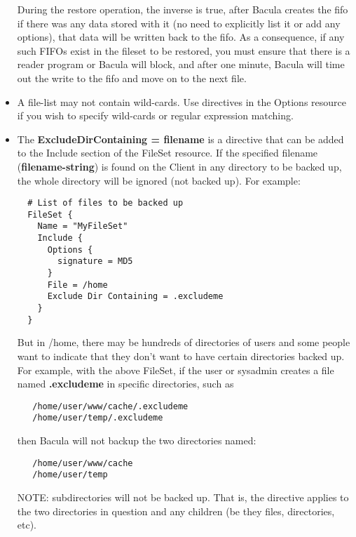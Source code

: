 \begin{itemize}
   During the restore operation, the inverse is true, after Bacula creates
   the fifo if there was any data stored with it (no need to explicitly
   list it or add any options), that data will be written back to the fifo.
   As a consequence, if any such FIFOs exist in the fileset to be restored,
   you must ensure that there is a reader program or Bacula will block, and
   after one minute, Bacula will time out the write to the fifo and move on
   to the next file.

\item A file-list may not contain wild-cards. Use directives in the
   Options resource if you wish to specify wild-cards or regular expression
   matching.

\item
{}
The {\bf ExcludeDirContaining = \lt{}filename\gt{}} is a directive that
can be added to the Include section of the FileSet resource.  If the specified
filename ({\bf filename-string}) is found on the Client in any directory to be
backed up, the whole directory will be ignored (not backed up).  For example:

\begin{verbatim}
  # List of files to be backed up
  FileSet {
    Name = "MyFileSet"
    Include {
      Options {
        signature = MD5
      }
      File = /home
      Exclude Dir Containing = .excludeme
    }
  }
\end{verbatim}

But in /home, there may be hundreds of directories of users and some
people want to indicate that they don't want to have certain
directories backed up. For example, with the above FileSet, if
the user or sysadmin creates a file named {\bf .excludeme} in 
specific directories, such as

\begin{verbatim}
   /home/user/www/cache/.excludeme
   /home/user/temp/.excludeme
\end{verbatim}

then Bacula will not backup the two directories named:

\begin{verbatim}
   /home/user/www/cache
   /home/user/temp
\end{verbatim}

NOTE: subdirectories will not be backed up.  That is, the directive
applies to the two directories in question and any children (be they
files, directories, etc).

\end{itemize}

